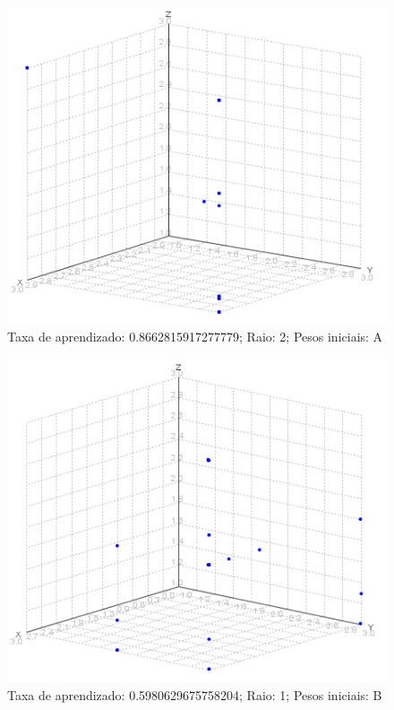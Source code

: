 \begin{figure}[ht!]
	\centering
	\includegraphics[scale=0.65]{./imgs/2a2.png}
	\caption{Taxa de aprendizado: 0.8662815917277779; Raio: 2; Pesos iniciais: A}
\end{figure}

\begin{figure}[ht!]
	\centering
	\includegraphics[scale=0.65]{./imgs/2b1.png}
	\caption{Taxa de aprendizado: 0.5980629675758204; Raio: 1; Pesos iniciais: B}
\end{figure}

